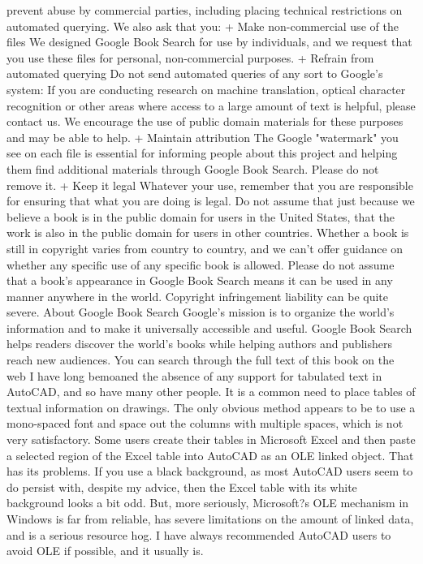 \documentclass[a4paper]{article}
\begin{document}
{prevent abuse by commercial parties, including placing technical restrictions on automated querying. 
We also ask that you: 
+ Make non-commercial use of the files We designed Google Book Search for use by individuals, and we request that you use these files for 
personal, non-commercial purposes. 
+ Refrain from automated querying Do not send automated queries of any sort to Google's system: If you are conducting research on machine 
translation, optical character recognition or other areas where access to a large amount of text is helpful, please contact us. We encourage the 
use of public domain materials for these purposes and may be able to help. 
+ Maintain attribution The Google "watermark" you see on each file is essential for informing people about this project and helping them find 
additional materials through Google Book Search. Please do not remove it. 
+ Keep it legal Whatever your use, remember that you are responsible for ensuring that what you are doing is legal. Do not assume that just 
because we believe a book is in the public domain for users in the United States, that the work is also in the public domain for users in other 
countries. Whether a book is still in copyright varies from country to country, and we can't offer guidance on whether any specific use of 
any specific book is allowed. Please do not assume that a book's appearance in Google Book Search means it can be used in any manner 
anywhere in the world. Copyright infringement liability can be quite severe. 
About Google Book Search 
Google's mission is to organize the world's information and to make it universally accessible and useful. Google Book Search helps readers 
discover the world's books while helping authors and publishers reach new audiences. You can search through the full text of this book on the web 
I have long bemoaned the absence of any support for tabulated text in AutoCAD, and so have many other people. It is a common need to place tables of textual information on drawings. The only obvious method appears to be to use a mono-spaced font and space out the columns with multiple spaces, which is not very satisfactory.
Some users create their tables in Microsoft Excel and then paste a selected region of the Excel table into AutoCAD as an OLE linked object. That has its problems. If you use a black background, as most AutoCAD users seem to do persist with, despite my advice, then the Excel table with its white background looks a bit odd. But, more seriously, Microsoft?s OLE mechanism in Windows is far from reliable, has severe limitations on the amount of linked data, and is a serious resource hog. I have always recommended AutoCAD users to avoid OLE if possible, and it usually is.
}
\end{document}
